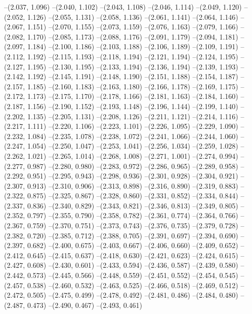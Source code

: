 {--(2.037, 1.096)
--(2.040, 1.102)
--(2.043, 1.108)
--(2.046, 1.114)
--(2.049, 1.120)
--(2.052, 1.126)
--(2.055, 1.131)
--(2.058, 1.136)
--(2.061, 1.141)
--(2.064, 1.146)
--(2.067, 1.151)
--(2.070, 1.155)
--(2.073, 1.159)
--(2.076, 1.163)
--(2.079, 1.166)
--(2.082, 1.170)
--(2.085, 1.173)
--(2.088, 1.176)
--(2.091, 1.179)
--(2.094, 1.181)
--(2.097, 1.184)
--(2.100, 1.186)
--(2.103, 1.188)
--(2.106, 1.189)
--(2.109, 1.191)
--(2.112, 1.192)
--(2.115, 1.193)
--(2.118, 1.194)
--(2.121, 1.194)
--(2.124, 1.195)
--(2.127, 1.195)
--(2.130, 1.195)
--(2.133, 1.194)
--(2.136, 1.194)
--(2.139, 1.193)
--(2.142, 1.192)
--(2.145, 1.191)
--(2.148, 1.190)
--(2.151, 1.188)
--(2.154, 1.187)
--(2.157, 1.185)
--(2.160, 1.183)
--(2.163, 1.180)
--(2.166, 1.178)
--(2.169, 1.175)
--(2.172, 1.173)
--(2.175, 1.170)
--(2.178, 1.166)
--(2.181, 1.163)
--(2.184, 1.160)
--(2.187, 1.156)
--(2.190, 1.152)
--(2.193, 1.148)
--(2.196, 1.144)
--(2.199, 1.140)
--(2.202, 1.135)
--(2.205, 1.131)
--(2.208, 1.126)
--(2.211, 1.121)
--(2.214, 1.116)
--(2.217, 1.111)
--(2.220, 1.106)
--(2.223, 1.101)
--(2.226, 1.095)
--(2.229, 1.090)
--(2.232, 1.084)
--(2.235, 1.078)
--(2.238, 1.072)
--(2.241, 1.066)
--(2.244, 1.060)
--(2.247, 1.054)
--(2.250, 1.047)
--(2.253, 1.041)
--(2.256, 1.034)
--(2.259, 1.028)
--(2.262, 1.021)
--(2.265, 1.014)
--(2.268, 1.008)
--(2.271, 1.001)
--(2.274, 0.994)
--(2.277, 0.987)
--(2.280, 0.980)
--(2.283, 0.972)
--(2.286, 0.965)
--(2.289, 0.958)
--(2.292, 0.951)
--(2.295, 0.943)
--(2.298, 0.936)
--(2.301, 0.928)
--(2.304, 0.921)
--(2.307, 0.913)
--(2.310, 0.906)
--(2.313, 0.898)
--(2.316, 0.890)
--(2.319, 0.883)
--(2.322, 0.875)
--(2.325, 0.867)
--(2.328, 0.860)
--(2.331, 0.852)
--(2.334, 0.844)
--(2.337, 0.836)
--(2.340, 0.829)
--(2.343, 0.821)
--(2.346, 0.813)
--(2.349, 0.805)
--(2.352, 0.797)
--(2.355, 0.790)
--(2.358, 0.782)
--(2.361, 0.774)
--(2.364, 0.766)
--(2.367, 0.759)
--(2.370, 0.751)
--(2.373, 0.743)
--(2.376, 0.735)
--(2.379, 0.728)
--(2.382, 0.720)
--(2.385, 0.712)
--(2.388, 0.705)
--(2.391, 0.697)
--(2.394, 0.690)
--(2.397, 0.682)
--(2.400, 0.675)
--(2.403, 0.667)
--(2.406, 0.660)
--(2.409, 0.652)
--(2.412, 0.645)
--(2.415, 0.637)
--(2.418, 0.630)
--(2.421, 0.623)
--(2.424, 0.615)
--(2.427, 0.608)
--(2.430, 0.601)
--(2.433, 0.594)
--(2.436, 0.587)
--(2.439, 0.580)
--(2.442, 0.573)
--(2.445, 0.566)
--(2.448, 0.559)
--(2.451, 0.552)
--(2.454, 0.545)
--(2.457, 0.538)
--(2.460, 0.532)
--(2.463, 0.525)
--(2.466, 0.518)
--(2.469, 0.512)
--(2.472, 0.505)
--(2.475, 0.499)
--(2.478, 0.492)
--(2.481, 0.486)
--(2.484, 0.480)
--(2.487, 0.473)
--(2.490, 0.467)
--(2.493, 0.461)
}
